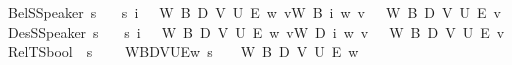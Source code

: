 \begin{isabellebody}
\ BelS{\isacharcolon}{\kern0pt}{\isacharcolon}{\kern0pt}{\isachardoublequoteopen}Speaker{\isasymRightarrow}{\isasymsigma}{\isasymRightarrow}{\isasymsigma}{\isachardoublequoteclose}\ {\isacharparenleft}{\kern0pt}{\isachardoublequoteopen}{\isasymB}\isactrlsup s{\isachardoublequoteclose}{\isacharparenright}{\kern0pt}\ \isanewline
\ \ {\isachardoublequoteopen}{\isasymB}\isactrlsup s\ i\ {\isasymphi}\ {\isasymequiv}\ {\isasymlambda}W\ B\ D\ V\ U\ E\ w{\isachardot}{\kern0pt}\ {\isasymforall}v{\isacharcolon}{\kern0pt}W{\isachardot}{\kern0pt}\ B\ i\ w\ v\ {\isasymlongrightarrow}\ {\isasymphi}\ W\ B\ D\ V\ U\ E\ v{\isachardoublequoteclose}\isanewline
{}\isamarkupfalse%
\ DesS{\isacharcolon}{\kern0pt}{\isacharcolon}{\kern0pt}{\isachardoublequoteopen}Speaker{\isasymRightarrow}{\isasymsigma}{\isasymRightarrow}{\isasymsigma}{\isachardoublequoteclose}\ {\isacharparenleft}{\kern0pt}{\isachardoublequoteopen}{\isasymD}\isactrlsup s{\isachardoublequoteclose}{\isacharparenright}{\kern0pt}\ \isanewline
\ \ {\isachardoublequoteopen}{\isasymD}\isactrlsup s\ i\ {\isasymphi}\ {\isasymequiv}\ {\isasymlambda}W\ B\ D\ V\ U\ E\ w{\isachardot}{\kern0pt}\ {\isasymforall}v{\isacharcolon}{\kern0pt}W{\isachardot}{\kern0pt}\ D\ i\ w\ v\ {\isasymlongrightarrow}\ {\isasymphi}\ W\ B\ D\ V\ U\ E\ v{\isachardoublequoteclose}\isanewline
\isanewline
{}\isamarkupfalse%
\ RelTS{\isacharcolon}{\kern0pt}{\isacharcolon}{\kern0pt}{\isachardoublequoteopen}{\isasymW}{\isasymRightarrow}{\isasymR}{\isasymRightarrow}{\isasymR}{\isasymRightarrow}{\isasymV}{\isasymRightarrow}{\isasymU}{\isasymRightarrow}{\isasymE}{\isasymRightarrow}{\isasymw}{\isasymRightarrow}{\isasymsigma}{\isasymRightarrow}bool{\isachardoublequoteclose}\ {\isacharparenleft}{\kern0pt}{\isachardoublequoteopen}{\isasymlangle}{\isacharunderscore}{\kern0pt}{\isacharcomma}{\kern0pt}{\isacharunderscore}{\kern0pt}{\isacharcomma}{\kern0pt}{\isacharunderscore}{\kern0pt}{\isacharcomma}{\kern0pt}{\isacharunderscore}{\kern0pt}{\isacharcomma}{\kern0pt}{\isacharunderscore}{\kern0pt}{\isacharcomma}{\kern0pt}{\isacharunderscore}{\kern0pt}{\isasymrangle}{\isacharcomma}{\kern0pt}{\isacharunderscore}{\kern0pt}\ {\isasymTurnstile}\isactrlsup s\ {\isacharunderscore}{\kern0pt}{\isachardoublequoteclose}{\isacharparenright}{\kern0pt}\ \isanewline
\ \ {\isachardoublequoteopen}{\isasymlangle}W{\isacharcomma}{\kern0pt}B{\isacharcomma}{\kern0pt}D{\isacharcomma}{\kern0pt}V{\isacharcomma}{\kern0pt}U{\isacharcomma}{\kern0pt}E{\isasymrangle}{\isacharcomma}{\kern0pt}w\ {\isasymTurnstile}\isactrlsup s\ {\isasymphi}\ {\isasymequiv}\ {\isasymphi}\ W\ B\ D\ V\ U\ E\ w{\isachardoublequoteclose}\isanewline

\end{isabellebody}
